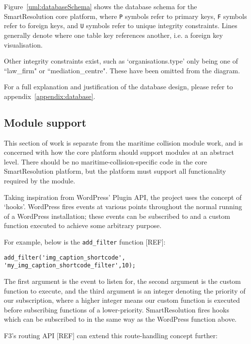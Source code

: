 Figure~\ref{uml:databaseSchema} shows the database schema for the SmartResolution core platform, where \lstinline{P} symbols refer to primary keys, \lstinline{F} symbols refer to foreign keys, and \lstinline{U} symbols refer to unique integrity constraints. Lines generally denote where one table key references another, i.e. a foreign key visualisation.

Other integrity constraints exist, such as `organisations.type' only being one of ``law\_firm" or ``mediation\_centre". These have been omitted from the diagram.

For a full explanation and justification of the database design, please refer to appendix~\ref{appendix:database}.

\subsection{Module support}

This section of work is separate from the maritime collision module work, and is concerned with how the core platform should support modules at an abstract level. There should be no maritime-collision-specific code in the core SmartResolution platform, but the platform must support all functionality required by the module.

Taking inspiration from WordPress' Plugin API, the project uses the concept of `hooks'. WordPress fires events at various points throughout the normal running of a WordPress installation; these events can be subscribed to and a custom function executed to achieve some arbitrary purpose.

For example, below is the \lstinline{add_filter} function [REF]: %

\begin{lstlisting}
add_filter('img_caption_shortcode', 'my_img_caption_shortcode_filter',10);
\end{lstlisting}

The first argument is the event to listen for, the second argument is the custom function to execute, and the third argument is an integer denoting the priority of our subscription, where a higher integer means our custom function is executed before subscribing functions of a lower-priority. SmartResolution fires hooks which can be subscribed to in the same way as the WordPress function above.

F3's routing API [REF] can extend this route-handling concept further:

